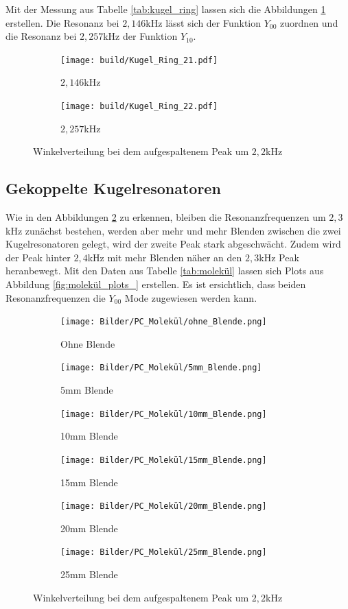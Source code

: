 Mit der Messung aus Tabelle \ref{tab:kugel_ring} lassen sich die Abbildungen \ref{fig:kugel_ring} erstellen.
Die Resonanz bei $2,146$kHz lässt sich der Funktion $Y_{00}$ zuordnen und die Resonanz bei $2,257$kHz  der Funktion $Y_{10}$.
\begin{figure}
  \centering
  \begin{subfigure}{0.4\textwidth}
    \centering
    \texttt{[image: build/Kugel\_Ring\_21.pdf]}
    \caption{$2,146$kHz}
  \end{subfigure}
  \begin{subfigure}{0.4\textwidth}
    \centering
    \texttt{[image: build/Kugel\_Ring\_22.pdf]}
    \caption{$2,257$kHz}
  \end{subfigure}
  \caption{Winkelverteilung bei dem aufgespaltenem Peak um $2,2$kHz}
  \label{fig:kugel_ring}
\end{figure}

\subsection{Gekoppelte Kugelresonatoren}
Wie in den Abbildungen \ref{fig:molekül_plots} zu erkennen, bleiben die Resonanzfrequenzen um $2,3$kHz zunächst bestehen,
werden aber mehr und mehr Blenden zwischen die zwei Kugelresonatoren gelegt, wird der zweite Peak stark abgeschwächt.
Zudem wird der Peak hinter $2,4$kHz mit mehr Blenden näher an den $2,3$kHz Peak heranbewegt.
Mit den Daten aus Tabelle \ref{tab:molekül} lassen sich Plots aus Abbildung \ref{fig:molekül_plots_} erstellen.
Es ist ersichtlich, dass beiden Resonanzfrequenzen die $Y_{00}$ Mode zugewiesen werden kann.

\begin{figure}
  \centering
  \begin{subfigure}{0.4\textwidth}
    \centering
    \texttt{[image: Bilder/PC\_Molekül/ohne\_Blende.png]}
    \caption{Ohne Blende}
  \end{subfigure}
  \begin{subfigure}{0.4\textwidth}
    \centering
    \texttt{[image: Bilder/PC\_Molekül/5mm\_Blende.png]}
    \caption{5mm Blende}
  \end{subfigure}
  \begin{subfigure}{0.4\textwidth}
    \centering
    \texttt{[image: Bilder/PC\_Molekül/10mm\_Blende.png]}
    \caption{10mm Blende}
  \end{subfigure}
  \begin{subfigure}{0.4\textwidth}
    \centering
    \texttt{[image: Bilder/PC\_Molekül/15mm\_Blende.png]}
    \caption{15mm Blende}
  \end{subfigure}
  \begin{subfigure}{0.4\textwidth}
    \centering
    \texttt{[image: Bilder/PC\_Molekül/20mm\_Blende.png]}
    \caption{20mm Blende}
  \end{subfigure}
  \begin{subfigure}{0.4\textwidth}
    \centering
    \texttt{[image: Bilder/PC\_Molekül/25mm\_Blende.png]}
    \caption{25mm Blende}
  \end{subfigure}
  \caption{Winkelverteilung bei dem aufgespaltenem Peak um $2,2$kHz}
  \label{fig:molekül_plots}
\end{figure}

